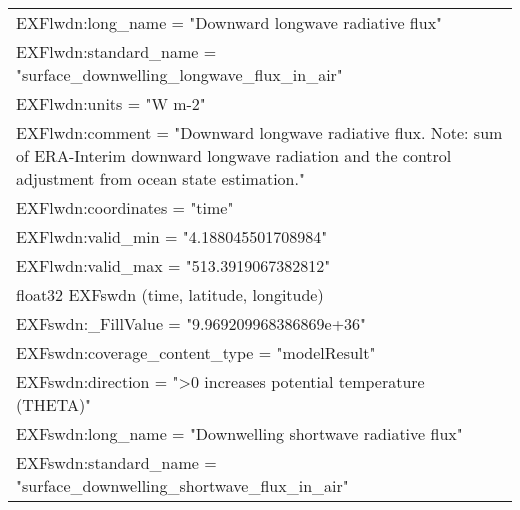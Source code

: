 \begin{longtable}{|p{\textwidth}|}
\hspace{0.5cm}\hspace{0.5cm}EXFlwdn:long\_name = "Downward longwave radiative flux"\\
\hspace{0.5cm}\hspace{0.5cm}EXFlwdn:standard\_name = "surface\_downwelling\_longwave\_flux\_in\_air"\\
\hspace{0.5cm}\hspace{0.5cm}EXFlwdn:units = "W m-2"\\
\hspace{0.5cm}\hspace{0.5cm}EXFlwdn:comment = "Downward longwave radiative flux. Note: sum of ERA-Interim downward longwave radiation and the control adjustment from ocean state estimation."\\
\hspace{0.5cm}\hspace{0.5cm}EXFlwdn:coordinates = "time"\\
\hspace{0.5cm}\hspace{0.5cm}EXFlwdn:valid\_min = "4.188045501708984"\\
\hspace{0.5cm}\hspace{0.5cm}EXFlwdn:valid\_max = "513.3919067382812"\\
\hspace{0.5cm}float32 EXFswdn (time, latitude, longitude)\\
\hspace{0.5cm}\hspace{0.5cm}EXFswdn:\_FillValue = "9.969209968386869e+36"\\
\hspace{0.5cm}\hspace{0.5cm}EXFswdn:coverage\_content\_type = "modelResult"\\
\hspace{0.5cm}\hspace{0.5cm}EXFswdn:direction = ">0 increases potential temperature (THETA)"\\
\hspace{0.5cm}\hspace{0.5cm}EXFswdn:long\_name = "Downwelling shortwave radiative flux"\\
\hspace{0.5cm}\hspace{0.5cm}EXFswdn:standard\_name = "surface\_downwelling\_shortwave\_flux\_in\_air"\\

\end{longtable}
